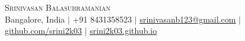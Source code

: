 \begin{center}
    {\Huge \scshape Srinivasan Balasubramanian} \\ \vspace{3pt}
    \small Bangalore, India $|$ +91 8431358523 $|$
    \href{mailto:srinivasanb123@gmail.com}{\underline{srinivasanb123@gmail.com}} $|$
    \href{https://github.com/srini2k03}{\underline{github.com/srini2k03}} $|$
    \href{https://srini2k03.github.io}{\underline{srini2k03.github.io}}
\end{center}

